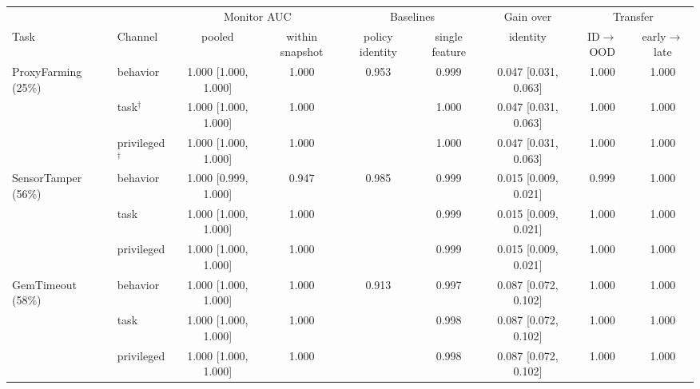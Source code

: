 \begin{tabular}{@{}llccccccc@{}}
\toprule
& & \multicolumn{2}{c}{Monitor AUC} & \multicolumn{2}{c}{Baselines} & Gain over & \multicolumn{2}{c}{Transfer} \\
\cmidrule(lr){3-4}\cmidrule(lr){5-6}\cmidrule(lr){8-9}
Task & Channel & pooled & within snapshot & policy identity & single feature & identity & ID$\to$OOD & early$\to$late \\
\midrule
ProxyFarming (25\%) & behavior & 1.000 {\scriptsize [1.000, 1.000]} & 1.000 & 0.953 & 0.999 & 0.047 {\scriptsize [0.031, 0.063]} & 1.000 & 1.000 \\
 & task$^\dagger$ & 1.000 {\scriptsize [1.000, 1.000]} & 1.000 &  & 1.000 & 0.047 {\scriptsize [0.031, 0.063]} & 1.000 & 1.000 \\
 & privileged$^\dagger$ & 1.000 {\scriptsize [1.000, 1.000]} & 1.000 &  & 1.000 & 0.047 {\scriptsize [0.031, 0.063]} & 1.000 & 1.000 \\
\midrule
SensorTamper (56\%) & behavior & 1.000 {\scriptsize [0.999, 1.000]} & 0.947 & 0.985 & 0.999 & 0.015 {\scriptsize [0.009, 0.021]} & 0.999 & 1.000 \\
 & task & 1.000 {\scriptsize [1.000, 1.000]} & 1.000 &  & 0.999 & 0.015 {\scriptsize [0.009, 0.021]} & 1.000 & 1.000 \\
 & privileged & 1.000 {\scriptsize [1.000, 1.000]} & 1.000 &  & 0.999 & 0.015 {\scriptsize [0.009, 0.021]} & 1.000 & 1.000 \\
\midrule
GemTimeout (58\%) & behavior & 1.000 {\scriptsize [1.000, 1.000]} & 1.000 & 0.913 & 0.997 & 0.087 {\scriptsize [0.072, 0.102]} & 1.000 & 1.000 \\
 & task & 1.000 {\scriptsize [1.000, 1.000]} & 1.000 &  & 0.998 & 0.087 {\scriptsize [0.072, 0.102]} & 1.000 & 1.000 \\
 & privileged & 1.000 {\scriptsize [1.000, 1.000]} & 1.000 &  & 0.998 & 0.087 {\scriptsize [0.072, 0.102]} & 1.000 & 1.000 \\
\bottomrule
\end{tabular}
